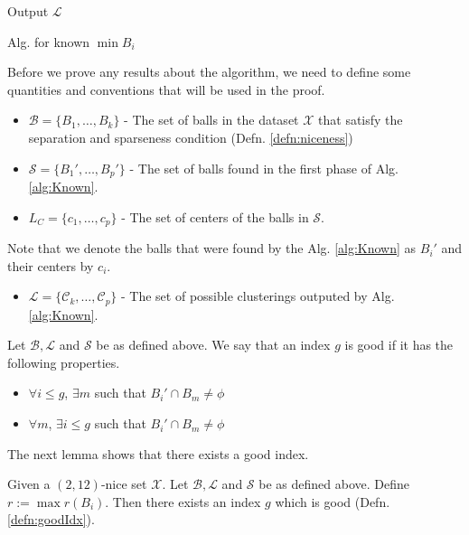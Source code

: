 \documentclass[11pt]{article}
\newcommand{\mc}{\mathcal}
\newenvironment{alg}{
    \begin{list}{}{
        \setlength{\itemsep}{2pt}
        \setlength{\parsep}{0pt}
        \setlength{\parskip}{0pt}
        \setlength{\topsep}{1pt}
    }
}
{
    \end{list}
}
\begin{document}
\begin{algorithm}
\begin{alg}
\begin{itemize}
\end{itemize}
\item[] Output $\mc L$ %
\label{alg:Known}
\end{alg}
\caption{Alg. for known $\min{B_i}$}
\end{algorithm}

Before we prove any results about the algorithm, we need to define some quantities and conventions that will be used in the proof.
\begin{itemize}
\item $\mc B = \{B_1, \ldots, B_k\}$ - The set of balls in the dataset $\mc X$ that satisfy the separation and sparseness condition (Defn. \ref{defn:niceness})
\item $\mc S = \{B_1', \ldots, B_p'\}$ - The set of balls found in the first phase of Alg. \ref{alg:Known}. 
\item $L_C = \{c_1, \ldots, c_p\}$ - The set of centers of the balls in $\mc S$.  
\end{itemize}
Note that we denote the balls that were found by the Alg. \ref{alg:Known} as $B_i'$ and their centers by $c_i$. 
\begin{itemize}
\item $\mc L = \{\mc C_k, \ldots, \mc C_p\}$ - The set of possible clusterings outputed by Alg. \ref{alg:Known}. 
\end{itemize}

\begin{definition}
\label{defn:goodIdx}
Let $\mc B, \mc L$ and $\mc S$ be as defined above. We say that an index $g$ is good if it has the following properties.
\begin{itemize}
\item $\forall i \le g$, $\exists m$ such that $B_i' \cap B_m \neq \phi$
\item $\forall m$, $\exists i \le g$ such that $B_i' \cap B_m \neq \phi$
\end{itemize}
The next lemma shows that there exists a good index.
\end{definition}

\begin{lemma}
Given a $(2,12)$-nice set $\mc X$. Let $\mc B, \mc L$ and $\mc S$ be as defined above. Define $r:= \max r(B_i)$. Then there exists an index $g$ which is good (Defn. \ref{defn:goodIdx}).
\label{lemma:goodIdx}
\end{lemma}
\end{document}
